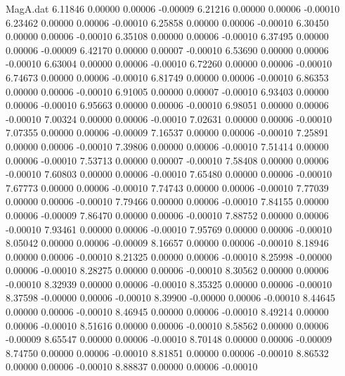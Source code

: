 \begin{filecontents}{MagA.dat}
   6.11846    0.00000    0.00006   -0.00009
   6.21216    0.00000    0.00006   -0.00010
   6.23462    0.00000    0.00006   -0.00010
   6.25858    0.00000    0.00006   -0.00010
   6.30450    0.00000    0.00006   -0.00010
   6.35108    0.00000    0.00006   -0.00010
   6.37495    0.00000    0.00006   -0.00009
   6.42170    0.00000    0.00007   -0.00010
   6.53690    0.00000    0.00006   -0.00010
   6.63004    0.00000    0.00006   -0.00010
   6.72260    0.00000    0.00006   -0.00010
   6.74673    0.00000    0.00006   -0.00010
   6.81749    0.00000    0.00006   -0.00010
   6.86353    0.00000    0.00006   -0.00010
   6.91005    0.00000    0.00007   -0.00010
   6.93403    0.00000    0.00006   -0.00010
   6.95663    0.00000    0.00006   -0.00010
   6.98051    0.00000    0.00006   -0.00010
   7.00324    0.00000    0.00006   -0.00010
   7.02631    0.00000    0.00006   -0.00010
   7.07355    0.00000    0.00006   -0.00009
   7.16537    0.00000    0.00006   -0.00010
   7.25891    0.00000    0.00006   -0.00010
   7.39806    0.00000    0.00006   -0.00010
   7.51414    0.00000    0.00006   -0.00010
   7.53713    0.00000    0.00007   -0.00010
   7.58408    0.00000    0.00006   -0.00010
   7.60803    0.00000    0.00006   -0.00010
   7.65480    0.00000    0.00006   -0.00010
   7.67773    0.00000    0.00006   -0.00010
   7.74743    0.00000    0.00006   -0.00010
   7.77039    0.00000    0.00006   -0.00010
   7.79466    0.00000    0.00006   -0.00010
   7.84155    0.00000    0.00006   -0.00009
   7.86470    0.00000    0.00006   -0.00010
   7.88752    0.00000    0.00006   -0.00010
   7.93461    0.00000    0.00006   -0.00010
   7.95769    0.00000    0.00006   -0.00010
   8.05042    0.00000    0.00006   -0.00009
   8.16657    0.00000    0.00006   -0.00010
   8.18946    0.00000    0.00006   -0.00010
   8.21325    0.00000    0.00006   -0.00010
   8.25998   -0.00000    0.00006   -0.00010
   8.28275    0.00000    0.00006   -0.00010
   8.30562    0.00000    0.00006   -0.00010
   8.32939    0.00000    0.00006   -0.00010
   8.35325    0.00000    0.00006   -0.00010
   8.37598   -0.00000    0.00006   -0.00010
   8.39900   -0.00000    0.00006   -0.00010
   8.44645    0.00000    0.00006   -0.00010
   8.46945    0.00000    0.00006   -0.00010
   8.49214    0.00000    0.00006   -0.00010
   8.51616    0.00000    0.00006   -0.00010
   8.58562    0.00000    0.00006   -0.00009
   8.65547    0.00000    0.00006   -0.00010
   8.70148    0.00000    0.00006   -0.00009
   8.74750    0.00000    0.00006   -0.00010
   8.81851    0.00000    0.00006   -0.00010
   8.86532    0.00000    0.00006   -0.00010
   8.88837    0.00000    0.00006   -0.00010

\end{filecontents}
